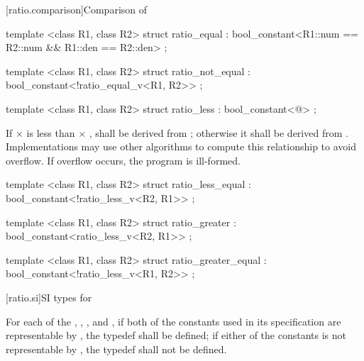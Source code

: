 [ratio.comparison]{Comparison of }

%
\begin{itemdecl}
template <class R1, class R2> struct ratio_equal
  : bool_constant<R1::num == R2::num && R1::den == R2::den> { };
\end{itemdecl}

%
\begin{itemdecl}
template <class R1, class R2> struct ratio_not_equal
  : bool_constant<!ratio_equal_v<R1, R2>> { };
\end{itemdecl}

%
\begin{itemdecl}
template <class R1, class R2> struct ratio_less
  : bool_constant<@\seebelow@> { };
\end{itemdecl}

\begin{itemdescr}
\pnum
If  $\times$  is less than  $\times$ ,
 shall be
derived from ; otherwise it shall be derived from
. Implementations may use other algorithms to
compute this relationship to avoid overflow. If overflow occurs, the program is ill-formed.
\end{itemdescr}

%
\begin{itemdecl}
template <class R1, class R2> struct ratio_less_equal
  : bool_constant<!ratio_less_v<R2, R1>> { };
\end{itemdecl}

%
\begin{itemdecl}
template <class R1, class R2> struct ratio_greater
  : bool_constant<ratio_less_v<R2, R1>> { };
\end{itemdecl}

%
\begin{itemdecl}
template <class R1, class R2> struct ratio_greater_equal
  : bool_constant<!ratio_less_v<R1, R2>> { };
\end{itemdecl}

[ratio.si]{SI types for }

\pnum
For each of the  , ,
, and , if both of the constants used in its
specification are representable by , the typedef shall be
defined; if either of the constants is not representable by ,
the typedef shall not be defined.

